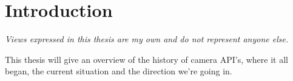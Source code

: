 \chapter{Introduction\label{intro}}
\textit{Views expressed in this thesis are my own and do not represent anyone else.}

This thesis will give an overview of the history of camera API's, where it all
began, the current situation and the direction we're going in.
